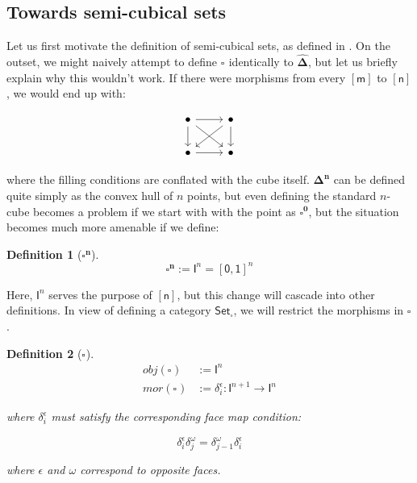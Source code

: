 \documentclass[10pt, titlepage]{amsart}
\newtheorem{definition}{Definition}
\newcommand{\Simplex}[1]{\ensuremath{\boldsymbol{\Delta^{#1}}}}
\newcommand{\DeltaHat}{\ensuremath{\hat{\boldsymbol{\Delta}}}}
\newcommand{\sq}[1]{\ensuremath{\mathsf{[#1]}}}
\newcommand{\Cube}[1]{\ensuremath{\boldsymbol{\square^{#1}}}}
\newcommand{\I}[1]{\ensuremath{\mathsf{I}^{#1}}}
\newcommand{\CSet}{\ensuremath{\mathsf{Set}_{\boldsymbol{\square}}}}
\begin{document}
\subsection{Towards semi-cubical sets}

Let us first motivate the definition of semi-cubical sets, as defined in \cite{Antolini00}. On the outset, we might naively attempt to define $\Cube{}$ identically to \DeltaHat, but let us briefly explain why this wouldn't work. If there were morphisms from every $\sq{m}$ to $\sq{n}$, we would end up with:

$$
  \begin{tikzcd}
    \bullet \arrow[r] \arrow[dr] \arrow[d] & \bullet \arrow[dl] \arrow[d] \\
    \bullet \arrow[r] & \bullet
  \end{tikzcd}
$$

where the filling conditions are conflated with the cube itself. $\Simplex{n}$ can be defined quite simply as the convex hull of $n$ points, but even defining the standard $n$-cube becomes a problem if we start with with the point as $\Cube{0}$, but the situation becomes much more amenable if we define:

\begin{definition}[\Cube{n}]
  \begin{equation*}
    \Cube{n} := \I{n} = \sq{0, 1}^n
  \end{equation*}
\end{definition}

Here, $\I{n}$ serves the purpose of $\sq{n}$, but this change will cascade into other definitions. In view of defining a category \CSet, we will restrict the morphisms in \Cube{}.

\begin{definition}[\Cube{}]
  \begin{align*}
    obj(\Cube{}) & := \I{n}                                           \\
    mor(\Cube{}) & := \delta^\epsilon_i : \I{n + 1} \rightarrow \I{n}
  \end{align*}

  where $\delta^\epsilon_i$ must satisfy the corresponding face map condition:

  \begin{equation*}
    \delta^\epsilon_i \delta^\omega_j = \delta^\omega_{j - 1} \delta^\epsilon_i
  \end{equation*}

  where $\epsilon$ and $\omega$ correspond to opposite faces.
\end{definition}
\end{document}
